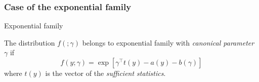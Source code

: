 \documentclass[compress,10pt]{beamer}
\newtheorem{proposition}{Proposition}
\begin{document}
% 
% 
% 
%  
% 

\subsubsection{Case of the exponential family}
\begin{frame}{Exponential family}\label{Slide:MixtureExpFam}
 
\label{Def:ExponFam}
\begin{definition} 
  The distribution $f(;\gamma)$ belongs to exponential family with {\em canonical parameter} $\gamma$ if
  \[
  f(y;\gamma) = \exp[\gamma^\intercal t(y) - a(y) - b(\gamma)]
  \]
  where $t(y)$ is the vector of the {\em sufficient statistics}.
\end{definition}
\end{frame}
\end{document}

